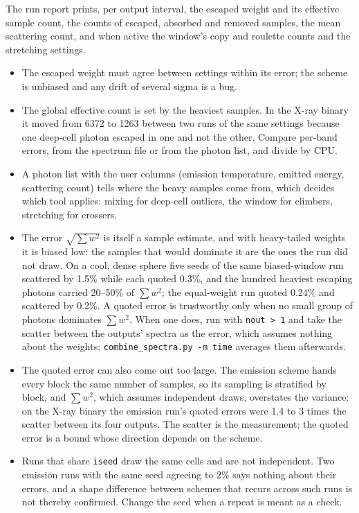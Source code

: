 \documentclass[11pt]{article}
\newcommand{\key}[1]{\texttt{#1}}
\begin{document}
The run report prints, per output interval, the escaped weight and its effective sample
count, the counts of escaped, absorbed and removed samples, the mean scattering count,
and when active the window's copy and roulette counts and the stretching settings.
\begin{itemize}
\item The escaped weight must agree between settings within its error; the scheme is
  unbiased and any drift of several sigma is a bug.
\item The global effective count is set by the heaviest samples. In the X-ray binary it
  moved from 6372 to 1263 between two runs of the same settings because one deep-cell
  photon escaped in one and not the other. Compare per-band errors, from the spectrum
  file or from the photon list, and divide by CPU.
\item A photon list with the user columns (emission temperature, emitted energy,
  scattering count) tells where the heavy samples come from, which decides which tool
  applies: mixing for deep-cell outliers, the window for climbers, stretching for
  crossers.
\item The error $\sqrt{\sum w^2}$ is itself a sample estimate, and with heavy-tailed
  weights it is biased low: the samples that would dominate it are the ones the run
  did not draw. On a cool, dense sphere five seeds of the same biased-window run
  scattered by 1.5\% while each quoted 0.3\%, and the hundred heaviest escaping
  photons carried 20--50\% of $\sum w^2$; the equal-weight run quoted 0.24\% and
  scattered by 0.2\%. A quoted error is trustworthy only when no small group of
  photons dominates $\sum w^2$. When one does, run with \key{nout > 1} and take the
  scatter between the outputs' spectra as the error, which assumes nothing about the
  weights; \key{combine\_spectra.py -m time} averages them afterwards.
\item The quoted error can also come out too large. The emission scheme hands every
  block the same number of samples, so its sampling is stratified by block, and
  $\sum w^2$, which assumes independent draws, overstates the variance: on the X-ray
  binary the emission run's quoted errors were 1.4 to 3 times the scatter between its
  four outputs. The scatter is the measurement; the quoted error is a bound whose
  direction depends on the scheme.
\item Runs that share \key{iseed} draw the same cells and are not independent. Two
  emission runs with the same seed agreeing to 2\% says nothing about their errors,
  and a shape difference between schemes that recurs across such runs is not thereby
  confirmed. Change the seed when a repeat is meant as a check.
\end{itemize}
\end{document}
